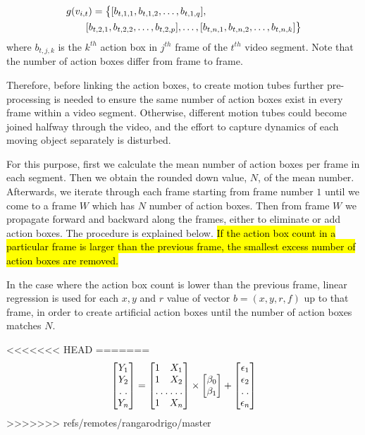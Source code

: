\begin{equation}
\label{eqn:action box}
\begin{split}
\MoveEqLeft
 g(v_{i,t}) = \big\{[b_{t,1,1},b_{t,1,2},\dots,b_{t,1,q}],\\
 & [b_{t,2,1},b_{t,2,2},\dots,b_{t,2,p}],\dots,[b_{t,n,1},b_{t,n,2},\dots,b_{t,n,k}]\big\}
\end{split}
\end{equation}
where $b_{t,j,k}$ is the $k^{th}$ action box in $j^{th}$ frame of the $t^{th}$ video segment. Note that the number of
action boxes differ from frame to frame.

Therefore, before linking the action boxes, to create motion tubes further pre-processing is needed to ensure the same number of action
boxes exist in every frame within a video segment. Otherwise, different motion tubes could become joined halfway through the video, and the
effort to capture dynamics of each moving object separately is disturbed.

For this purpose, first we calculate the mean number of action boxes per frame in each segment. Then we obtain the rounded down value, $N$, of the mean number. Afterwards, we iterate through each frame starting from frame number $1$ until we come to a frame $W$ which has $N$ number of action boxes. Then from frame $W$ we propagate forward and backward along the frames, either to eliminate or add action boxes. The procedure is explained below. \hl{If the action box count in a particular frame is larger than the previous frame, the smallest excess number of action boxes are removed.} %

In the case where the action box count is lower than the previous frame, linear regression %
is used for each $x,y$ and $r$ value of vector $b = (x,y,r,f)$
up to that frame, in order to create artificial action boxes until the number of action boxes matches $N$.

<<<<<<< HEAD
=======
\begin{equation}
\label{eqn:linear regression}
\begin{bmatrix}
    Y_{1}     \\
    Y_{2}     \\
    \hdotsfor{1} \\
    Y_{n}
\end{bmatrix}
=
\begin{bmatrix}
    1 & X_{1}     \\
    1 & X_{2}     \\
    \hdotsfor{2} \\
    1 & X_{n}
\end{bmatrix}
\times
\begin{bmatrix}
    \beta_{0}     \\
    \beta_{1}
\end{bmatrix}
+
\begin{bmatrix}
    \epsilon_{1}     \\
    \epsilon_{2}    \\
    \hdotsfor{1} \\
    \epsilon_{n}
\end{bmatrix}
\end{equation}
>>>>>>> refs/remotes/rangarodrigo/master

